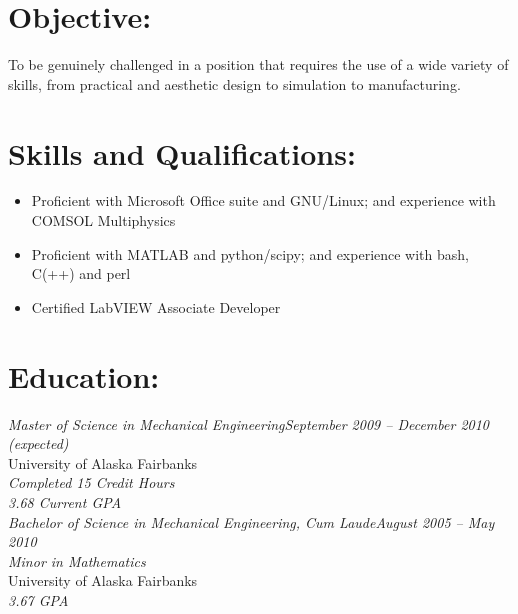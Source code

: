\documentclass[10pt, letterpaper]{resume}
\author{Joshua Holbrook}
\begin{document}
\maketitle

\section{Objective:}

\small To be genuinely challenged in a position that requires the use of a wide variety of skills, from practical and aesthetic design to simulation to manufacturing.\normalsize


\section{Skills and Qualifications:}
\small\begin{itemize}
\item Proficient with Microsoft Office suite and GNU/Linux; and experience with COMSOL Multiphysics
\item Proficient with MATLAB and python/scipy; and experience with bash, C(++) and perl
\item Certified LabVIEW Associate Developer
\end{itemize}\normalsize

\section{Education:}

\large\textit{Master of Science in Mechanical Engineering\hfill September 2009 -- December 2010 (expected)}\normalsize \\
University of Alaska Fairbanks\\
\emph{Completed 15 Credit Hours}\\
\emph{3.68 Current GPA}\\

\large\textit{Bachelor of Science in Mechanical Engineering, Cum Laude\hfill August 2005 -- May 2010}\normalsize \\
\textit{Minor in Mathematics}\\
University of Alaska Fairbanks\\
\textit{3.67 GPA} %
\end{document}

